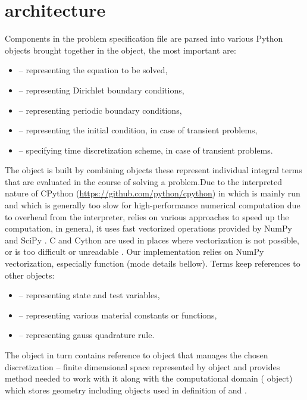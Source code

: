 \section{\sfepy{} architecture}
Components in the problem specification file are parsed into various 
Python 
objects  
brought together in the  object, the most important 
are:
\begin{itemize}
    \item {} -- representing the equation to be solved,
    \item {} -- representing Dirichlet boundary conditions,
    \item {} -- representing periodic boundary conditions,
    \item {} -- representing the initial condition, in case of 
    transient problems,
    \item {} -- specifying time discretization scheme, in case 
    of transient problems.
\end{itemize}
The  object is built by combining  
objects these represent individual integral terms that are evaluated in the course of 
solving a problem.Due to the interpreted nature of CPython 
(\url{https://github.com/python/cpython}) in which \sfepy{} is mainly run and which is 
generally too slow for high-performance numerical computation due to overhead from the 
interpreter, \sfepy{} relies on various approaches to speed up the computation, in 
general, it uses fast vectorized operations provided by NumPy and SciPy 
\cite{SciPy-NMeth2020}. C and Cython are used in places where vectorization is not 
possible, or is too difficult or unreadable \cite{Cimrman_Lukes_Rohan_2019}. Our 
implementation relies on NumPy vectorization, especially  function (mode 
details bellow). Terms keep references to other objects:
\begin{itemize}
    \item {} -- representing state and test variables,
    \item {} -- representing various material constants or functions,
    \item {} -- representing gauss quadrature rule.
\end{itemize}
The  object in turn contains reference to  object that 
manages the chosen discretization -- finite dimensional space represented by 
 object and provides method needed to work with it along with the 
computational domain ( object) which stores geometry 
including objects used in definition of  and 
.